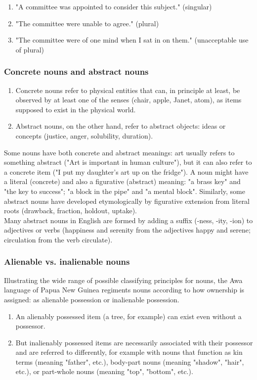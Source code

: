 \begin{enumerate}
    \item "A committee was appointed to consider this subject." (singular)
    \item "The committee were unable to agree." (plural)
    \item "The committee were of one mind when I sat in on them." (unacceptable use of plural)
\end{enumerate}

\subsubsection{Concrete nouns and abstract nouns \cite{wiki-noun}}
\begin{enumerate}
    \item Concrete nouns refer to physical entities that can, in principle at least, be observed by at least one of the senses (chair, apple, Janet, atom), as items supposed to exist in the physical world.
    \item Abstract nouns, on the other hand, refer to abstract objects: ideas or concepts (justice, anger, solubility, duration).
\end{enumerate}
Some nouns have both concrete and abstract meanings: art usually refers to something abstract ("Art is important in human culture"), but it can also refer to a concrete item ("I put my daughter's art up on the fridge"). A noun might have a literal (concrete) and also a figurative (abstract) meaning: "a brass key" and "the key to success"; "a block in the pipe" and "a mental block". Similarly, some abstract nouns have developed etymologically by figurative extension from literal roots (drawback, fraction, holdout, uptake).\\

Many abstract nouns in English are formed by adding a suffix (-ness, -ity, -ion) to adjectives or verbs (happiness and serenity from the adjectives happy and serene; circulation from the verb circulate).


\subsubsection{Alienable vs. inalienable nouns}
Illustrating the wide range of possible classifying principles for nouns, the Awa language of Papua New Guinea regiments nouns according to how ownership is assigned: as alienable possession or inalienable possession. 
\begin{enumerate}
    \item An alienably possessed item (a tree, for example) can exist even without a possessor.
    \item But inalienably possessed items are necessarily associated with their possessor and are referred to differently, for example with nouns that function as kin terms (meaning "father", etc.), body-part nouns (meaning "shadow", "hair", etc.), or part-whole nouns (meaning "top", "bottom", etc.).
\end{enumerate}



